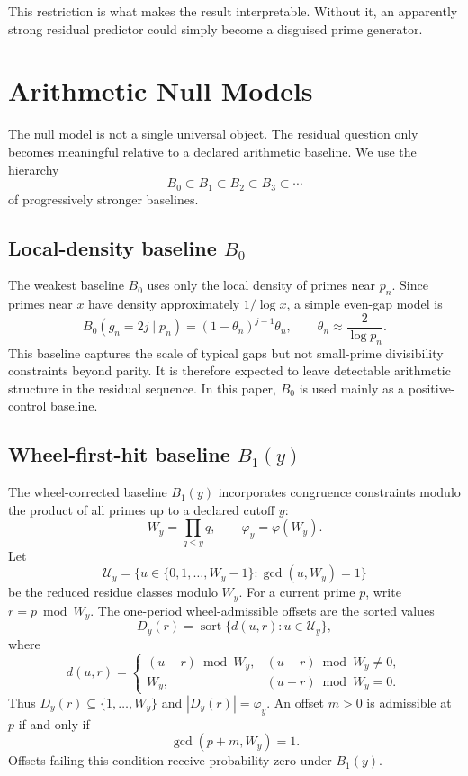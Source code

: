 \documentclass[11pt]{article}
\begin{document}
This restriction is what makes the result interpretable. Without it, an apparently strong residual predictor could simply become a disguised prime generator.

\section{Arithmetic Null Models}

The null model is not a single universal object. The residual question only becomes meaningful relative to a declared arithmetic baseline. We use the hierarchy
\[
B_0\subset B_1\subset B_2\subset B_3\subset\cdots
\]
of progressively stronger baselines.

\subsection{Local-density baseline $B_0$}

The weakest baseline $B_0$ uses only the local density of primes near $p_n$. Since primes near $x$ have density approximately $1/\log x$, a simple even-gap model is
\[
B_0(g_n=2j\mid p_n)=(1-\theta_n)^{j-1}\theta_n,
\qquad
\theta_n\approx \frac{2}{\log p_n}.
\]
This baseline captures the scale of typical gaps but not small-prime divisibility constraints beyond parity. It is therefore expected to leave detectable arithmetic structure in the residual sequence. In this paper, $B_0$ is used mainly as a positive-control baseline.

\subsection{Wheel-first-hit baseline $B_1(y)$}

The wheel-corrected baseline $B_1(y)$ incorporates congruence constraints modulo the product of all primes up to a declared cutoff $y$:
\[
W_y=\prod_{q\leq y}q,
\qquad
\varphi_y=\varphi(W_y).
\]
Let
\[
\mathcal U_y=\{u\in\{0,1,\ldots,W_y-1\}:\gcd(u,W_y)=1\}
\]
be the reduced residue classes modulo $W_y$. For a current prime $p$, write $r=p\bmod W_y$. The one-period wheel-admissible offsets are the sorted values
\[
D_y(r)=\operatorname{sort}\{d(u,r):u\in\mathcal U_y\},
\]
where
\[
d(u,r)=
\begin{cases}
(u-r)\bmod W_y, & (u-r)\bmod W_y\neq0,\\
W_y, & (u-r)\bmod W_y=0.
\end{cases}
\]
Thus $D_y(r)\subseteq\{1,\ldots,W_y\}$ and $|D_y(r)|=\varphi_y$. An offset $m>0$ is admissible at $p$ if and only if
\[
\gcd(p+m,W_y)=1.
\]
Offsets failing this condition receive probability zero under $B_1(y)$.
\end{document}
